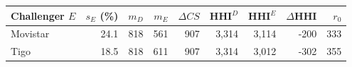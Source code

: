 \begin{tabular}{lrrrrrrrr}
\toprule
Challenger $E$ & $s_E$ (\%) & $m_D$ & $m_E$ & $\Delta CS$ & HHI$^{D}$ & HHI$^{E}$ & $\Delta$HHI & $r_0$ \\
\midrule
Movistar & 24.1 & 818 & 561 & 907 & 3,314 & 3,114 & -200 & 333 \\
Tigo & 18.5 & 818 & 611 & 907 & 3,314 & 3,012 & -302 & 355 \\
\bottomrule
\end{tabular}
